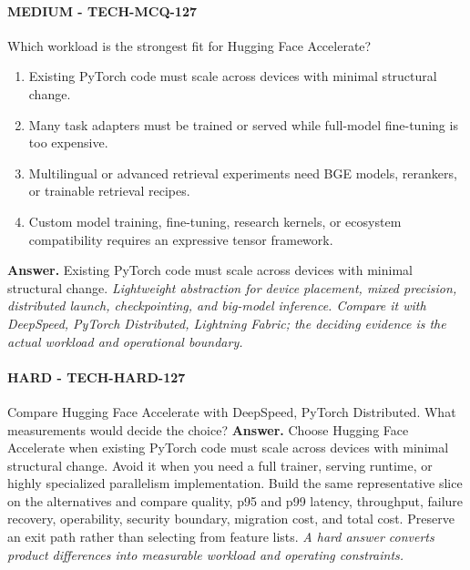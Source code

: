 \paragraph{MEDIUM - TECH-MCQ-127} Which workload is the strongest fit for Hugging Face Accelerate?
\begin{enumerate}[label=\Alph*.]
\item Existing PyTorch code must scale across devices with minimal structural change.
\item Many task adapters must be trained or served while full-model fine-tuning is too expensive.
\item Multilingual or advanced retrieval experiments need BGE models, rerankers, or trainable retrieval recipes.
\item Custom model training, fine-tuning, research kernels, or ecosystem compatibility requires an expressive tensor framework.
\end{enumerate}
\textbf{Answer.} Existing PyTorch code must scale across devices with minimal structural change.
\textit{Lightweight abstraction for device placement, mixed precision, distributed launch, checkpointing, and big-model inference. Compare it with DeepSpeed, PyTorch Distributed, Lightning Fabric; the deciding evidence is the actual workload and operational boundary.}
\paragraph{HARD - TECH-HARD-127} Compare Hugging Face Accelerate with DeepSpeed, PyTorch Distributed. What measurements would decide the choice?
\textbf{Answer.} Choose Hugging Face Accelerate when existing PyTorch code must scale across devices with minimal structural change. Avoid it when you need a full trainer, serving runtime, or highly specialized parallelism implementation. Build the same representative slice on the alternatives and compare quality, p95 and p99 latency, throughput, failure recovery, operability, security boundary, migration cost, and total cost. Preserve an exit path rather than selecting from feature lists.
\textit{A hard answer converts product differences into measurable workload and operating constraints.}
